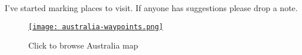 I've started marking places to visit. If anyone has suggestions please
drop a note.



\captionsetup[figure]{labelformat=empty}
\begin{figure}[htbp]
\centering
\href{https://maps.google.com/maps/ms?msa=0&msid=213851645709730088342.0004d53e918c9e4567ff9&hl=en&ie=UTF8&t=m&ll=-24.926295,134.121094&spn=33.104736,45.615234&z=4&source=embed}{\texttt{[image: australia-waypoints.png]}}
\caption{Click to browse Australia map}
\label{fig:3782X0}
\end{figure}


%